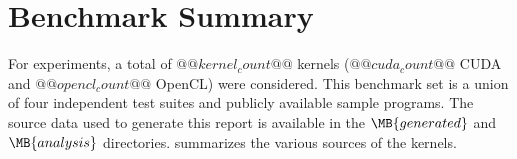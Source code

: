 \section{Benchmark Summary}
For experiments, a total of $@@kernel_count@@$ kernels ($@@cuda_count@@$ CUDA and $@@opencl_count@@$ OpenCL) were considered. This benchmark set is a union of four independent test suites and publicly available \cite{cudatoolkit} sample programs. The source data used to generate this report is available in the $\MB{generated}$ and $\MB{analysis}$ directories.  summarizes the various sources of the kernels.


